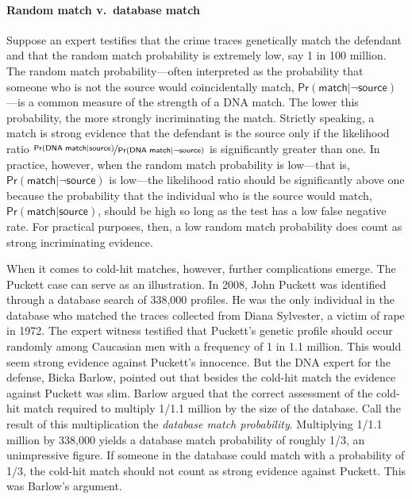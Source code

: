\documentclass{article}
\newcommand{\pr}{\mathsf{Pr}}
\begin{document}
   
   
   \paragraph{Random match v.~database match}
   
   
   Suppose an expert testifies that the crime traces genetically
match the defendant and  that the random match probability is extremely low, say 1 in 100 million. %
The random match probability---often interpreted as the probability that someone who is not the source would coincidentally match, $\pr(\textsf{match} \vert \neg \textsf{source})$---is a common measure of the strength of a DNA match. The lower this probability, the more strongly incriminating the match. %
Strictly speaking, a match  is strong evidence that the defendant is the source only if 
the likelihood ratio $\nicefrac{\pr(\textsf{DNA match} \vert \textsf{source})}{\pr(\textsf{DNA match} \vert \neg \textsf{source})}$ is significantly greater than one. 
   In practice, however, when the random match probability is low---that is,  $\pr(\textsf{match} \vert \neg \textsf{source})$ is low---the likelihood ratio should be significantly above one because the probability that the individual who is the source would match, $\pr(\textsf{match} \vert \textsf{source})$, should be high so long as the test has a  low false negative rate.  For practical purposes, then, a  low random match probability does count as strong incriminating evidence. 

   
  When it comes to cold-hit matches, however,  further complications emerge. %
  The Puckett case can serve as an illustration. In 2008, John Puckett was identified through a database search of 338,000 profiles. He was the only individual in the database who matched the traces collected from Diana Sylvester, a victim of rape  in 1972. The expert witness testified that %
Puckett's genetic profile 
should occur randomly among Caucasian men with a frequency of 1 in 1.1 million. This would seem strong evidence against Puckett's innocence. 
But the DNA expert  for the defense, Bicka Barlow,  pointed out that 
besides the cold-hit match the evidence against Puckett was slim. 
Barlow argued
that the correct assessment of  the cold-hit match required to multiply 1/1.1 million  by the size of the database. Call the result of this multiplication the \textit{database match probability}. Multiplying 1/1.1 million by 338,000 yields a database match probability of roughly 1/3, an unimpressive figure.  %
If someone in the database could match with a probability of 1/3, the cold-hit match should not count as strong evidence against Puckett. This was Barlow's argument. 
\end{document}
